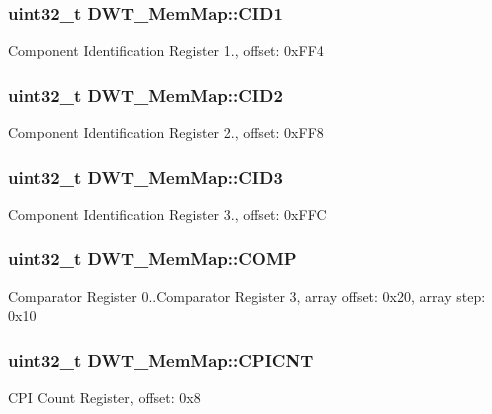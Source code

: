 \subsubsection[{C\+I\+D1}]{\setlength{\rightskip}{0pt plus 5cm}uint32\+\_\+t D\+W\+T\+\_\+\+Mem\+Map\+::\+C\+I\+D1}\label{struct_d_w_t___mem_map_a023bb3d410c13c5bd75ed9aedb0aed98}
Component Identification Register 1., offset\+: 0x\+F\+F4 \hypertarget{struct_d_w_t___mem_map_a79b7746489031d3b49004e1b2c400501}{}
\subsubsection[{C\+I\+D2}]{\setlength{\rightskip}{0pt plus 5cm}uint32\+\_\+t D\+W\+T\+\_\+\+Mem\+Map\+::\+C\+I\+D2}\label{struct_d_w_t___mem_map_a79b7746489031d3b49004e1b2c400501}
Component Identification Register 2., offset\+: 0x\+F\+F8 \hypertarget{struct_d_w_t___mem_map_af719ff30fb65a86a545f97f5b556e0b9}{}
\subsubsection[{C\+I\+D3}]{\setlength{\rightskip}{0pt plus 5cm}uint32\+\_\+t D\+W\+T\+\_\+\+Mem\+Map\+::\+C\+I\+D3}\label{struct_d_w_t___mem_map_af719ff30fb65a86a545f97f5b556e0b9}
Component Identification Register 3., offset\+: 0x\+F\+F\+C \hypertarget{struct_d_w_t___mem_map_ae10b19c1d610d27a71a1dc34a84a0e60}{}
\subsubsection[{C\+O\+M\+P}]{\setlength{\rightskip}{0pt plus 5cm}uint32\+\_\+t D\+W\+T\+\_\+\+Mem\+Map\+::\+C\+O\+M\+P}\label{struct_d_w_t___mem_map_ae10b19c1d610d27a71a1dc34a84a0e60}
Comparator Register 0..Comparator Register 3, array offset\+: 0x20, array step\+: 0x10 \hypertarget{struct_d_w_t___mem_map_ad09ed41fc08aebfa2c29e217afcf9a93}{}
\subsubsection[{C\+P\+I\+C\+N\+T}]{\setlength{\rightskip}{0pt plus 5cm}uint32\+\_\+t D\+W\+T\+\_\+\+Mem\+Map\+::\+C\+P\+I\+C\+N\+T}\label{struct_d_w_t___mem_map_ad09ed41fc08aebfa2c29e217afcf9a93}
C\+P\+I Count Register, offset\+: 0x8 \hypertarget{struct_d_w_t___mem_map_ab3581abb33e428126e7ec339e66514e4}{}
